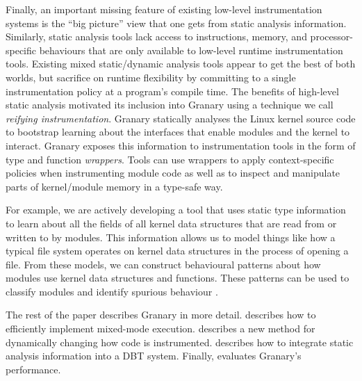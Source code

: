 \documentclass[preprint]{sigplanconf}
\begin{document}

Finally, an important missing feature of existing low-level instrumentation systems is the ``big picture'' view that one gets from static analysis information. Similarly, static analysis tools lack access to instructions, memory, and processor-specific behaviours that are only available to low-level runtime instrumentation tools. Existing mixed static/dynamic analysis tools \cite{NaCl,AddressSanitizer,ThreadSanitizer} appear to get the best of both worlds, but sacrifice on runtime flexibility by committing to a single instrumentation policy at a program's compile time. The benefits of high-level static analysis motivated its inclusion into Granary using a technique we call \emph{reifying instrumentation}. Granary statically analyses the Linux kernel source code to bootstrap learning about  the interfaces that enable modules and the kernel to interact. Granary exposes this information to instrumentation tools in the form of type and function \emph{wrappers}. Tools can use wrappers to apply context-specific policies when instrumenting module code as well as to inspect and manipulate parts of kernel/module memory in a type-safe way.

For example, we are actively developing a tool that uses static type information to learn about all the fields of all kernel data structures that are read from or written to by modules. This information allows us to model things like how a typical file system operates on kernel data structures in the process of opening a file. From these models, we can construct behavioural patterns about how modules use kernel data structures and functions. These patterns can be used to classify modules \cite{DeviceDriverClassification} and identify spurious behaviour \cite{LXFI}.

The rest of the paper describes Granary in more detail.  describes how to efficiently implement mixed-mode execution.  describes a new method for dynamically changing how code is instrumented.  describes how to integrate static analysis information into a DBT system. Finally,  evaluates Granary's performance.
\end{document}
